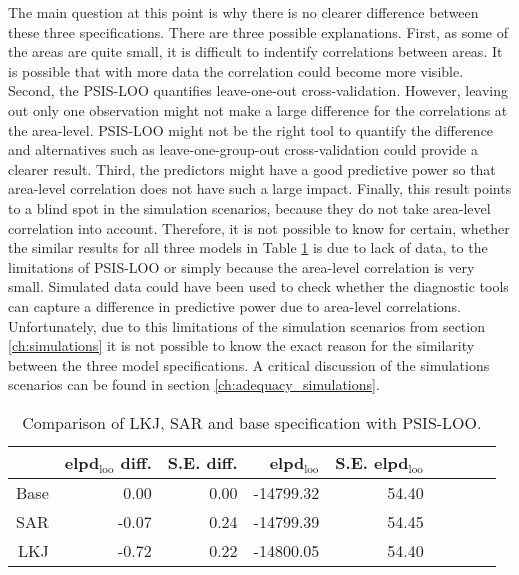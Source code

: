 The main question at this point is why there is no clearer difference between these three specifications.
There are three possible explanations.
First, as some of the areas are quite small, it is difficult to indentify correlations between areas.
It is possible that with more data the correlation could become more visible.
Second, the PSIS-LOO quantifies leave-one-out cross-validation.
However, leaving out only one observation might not make a large difference for the correlations at the area-level.
PSIS-LOO might not be the right tool to quantify the difference and alternatives such as leave-one-group-out cross-validation could provide a clearer result.
Third, the predictors might have a good predictive power so that area-level correlation does not have such a large impact.
Finally, this result points to a blind spot in the simulation scenarios, because they do not take area-level correlation into account.
Therefore, it is not possible to know for certain, whether the similar results for all three models in Table \ref{tab:lkj_sar_base} is due to lack of data, to the limitations of PSIS-LOO or simply because the area-level correlation is very small.
Simulated data could have been used to check whether the diagnostic tools can capture a difference in predictive power due to area-level correlations.
Unfortunately, due to this limitations of the simulation scenarios from section \ref{ch:simulations} it is not possible to know the exact reason for the similarity between the three model specifications.
A critical discussion of the simulations scenarios can be found in section \ref{ch:adequacy_simulations}.

\begin{table}[ht]
    \centering
    \caption{Comparison of LKJ, SAR and base specification with PSIS-LOO.}
    \begin{tabular}{rrrrrrrrr}
        \hline
        & elpd$_{\text{loo}}$ diff. & S.E. diff. & elpd$_{\text{loo}}$ & S.E. elpd$_{\text{loo}}$  \\
        \hline
        Base & 0.00 & 0.00 & -14799.32 & 54.40  \\
        SAR & -0.07 & 0.24 & -14799.39 & 54.45  \\
        LKJ & -0.72 & 0.22 & -14800.05 & 54.40  \\
        \hline
    \end{tabular}

    \label{tab:lkj_sar_base}
\end{table}



